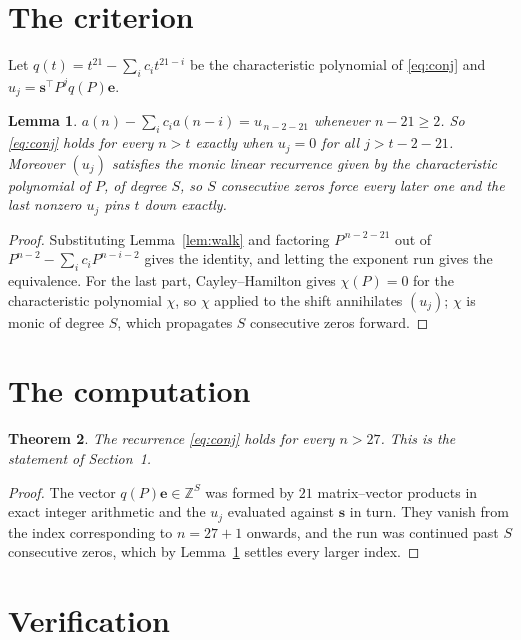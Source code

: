 \documentclass[11pt,a4paper]{article}
\theoremstyle{plain}
\newtheorem{theorem}{Theorem}
\newtheorem{lemma}[theorem]{Lemma}
\theoremstyle{definition}
\begin{document}
\section{The criterion}

Let $q(t)=t^{21}-\sum_i c_i t^{21-i}$ be the characteristic polynomial of
\eqref{eq:conj} and $u_j=\mathbf{s}^{\!\top}P^{j}q(P)\mathbf{e}$.

\begin{lemma}\label{lem:crit}
$a(n)-\sum_i c_i a(n-i)=u_{\,n-2-21}$ whenever $n-21\ge2$. So \eqref{eq:conj}
holds for every $n>t$ exactly when $u_j=0$ for all $j>t-2-21$. Moreover $(u_j)$
satisfies the monic linear recurrence given by the characteristic polynomial of $P$, of
degree $S$, so $S$ consecutive zeros force every later one and the last nonzero $u_j$ pins
$t$ down exactly.
\end{lemma}

\begin{proof}
Substituting Lemma~\ref{lem:walk} and factoring $P^{\,n-2-21}$ out of
$P^{n-2}-\sum_i c_i P^{n-i-2}$ gives the identity, and letting the exponent run gives the
equivalence. For the last part, Cayley--Hamilton gives $\chi(P)=0$ for the characteristic
polynomial $\chi$, so $\chi$ applied to the shift annihilates $(u_j)$; $\chi$ is monic of
degree $S$, which propagates $S$ consecutive zeros forward.
\end{proof}

\section{The computation}

\begin{theorem}
The recurrence \eqref{eq:conj} holds for every $n>27$. This is the statement of
Section~1.
\end{theorem}

\begin{proof}
The vector $q(P)\mathbf{e}\in\mathbb{Z}^{S}$ was formed by $21$ matrix--vector
products in exact integer arithmetic and the $u_j$ evaluated against $\mathbf{s}$ in turn.
They vanish from the index corresponding to $n=27+1$ onwards, and the run was continued
past $S$ consecutive zeros, which by Lemma~\ref{lem:crit} settles every larger index.
\end{proof}

\section{Verification}
\end{document}
